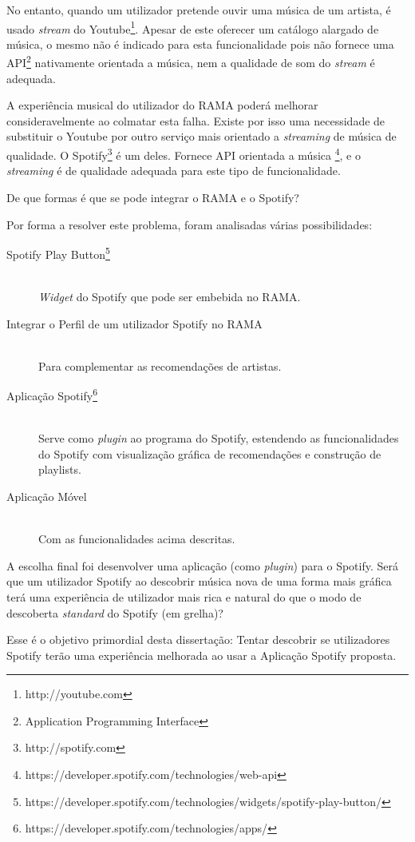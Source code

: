 No entanto, quando um utilizador pretende ouvir uma música de um artista, é usado \emph{stream} do Youtube\footnote{http://youtube.com}. 
Apesar de este oferecer um catálogo alargado de música, o mesmo não é indicado para esta funcionalidade pois não fornece uma API\footnote{Application Programming Interface} nativamente orientada a música, nem a qualidade de som do \emph{stream} é adequada.

A experiência musical do utilizador do RAMA poderá melhorar consideravelmente ao colmatar esta falha.
Existe por isso uma necessidade de substituir o Youtube por outro serviço mais orientado a \emph{streaming} de música de qualidade.
O Spotify\footnote{http://spotify.com} é um deles. Fornece API orientada a música \footnote{https://developer.spotify.com/technologies/web-api}, e o \emph{streaming} é de qualidade adequada para este tipo de funcionalidade.

De que formas é que se pode integrar o RAMA e o Spotify?

Por forma a resolver este problema, foram analisadas várias possibilidades:

\begin{description}
  \item[Spotify Play Button\footnote{https://developer.spotify.com/technologies/widgets/spotify-play-button/}] \hfill \\
    \emph{Widget} do Spotify que pode ser embebida no RAMA.
  \item[Integrar o Perfil de um utilizador Spotify no RAMA] \hfill \\
    Para complementar as recomendações de artistas.
  \item[Aplicação Spotify\footnote{https://developer.spotify.com/technologies/apps/}] \hfill \\
    Serve como \emph{plugin} ao programa do Spotify, estendendo as funcionalidades do Spotify com visualização gráfica de recomendações e construção de playlists.
  \item[Aplicação Móvel] \hfill \\
    Com as funcionalidades acima descritas.
\end{description}

A escolha final foi desenvolver uma aplicação (como \emph{plugin}) para o Spotify.
Será que um utilizador Spotify ao descobrir música nova de uma forma mais gráfica terá uma experiência de utilizador mais rica e natural do que o modo de descoberta \emph{standard} do Spotify (em grelha)?

Esse é o objetivo primordial desta dissertação: Tentar descobrir se utilizadores Spotify terão uma experiência melhorada ao usar a Aplicação Spotify proposta.

